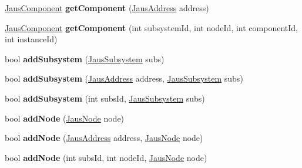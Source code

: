 \begin{DoxyCompactItemize}
\item 
\hypertarget{class_system_tree_addcab0b281dd5ad17c04c2c3c777c6d6}{\hyperlink{struct_jaus_component_struct}{\-Jaus\-Component} {\bfseries get\-Component} (\hyperlink{struct_jaus_address_struct}{\-Jaus\-Address} address)}\label{class_system_tree_addcab0b281dd5ad17c04c2c3c777c6d6}

\item 
\hypertarget{class_system_tree_a0dce53c86d89f770d19dd4b92568b775}{\hyperlink{struct_jaus_component_struct}{\-Jaus\-Component} {\bfseries get\-Component} (int subsystem\-Id, int node\-Id, int component\-Id, int instance\-Id)}\label{class_system_tree_a0dce53c86d89f770d19dd4b92568b775}

\item 
\hypertarget{class_system_tree_a69a0cda5b5d8525c29770ed3c6b3adee}{bool {\bfseries add\-Subsystem} (\hyperlink{struct_jaus_subsystem_struct}{\-Jaus\-Subsystem} subs)}\label{class_system_tree_a69a0cda5b5d8525c29770ed3c6b3adee}

\item 
\hypertarget{class_system_tree_a1afab58455805a6cc06974d6474d6903}{bool {\bfseries add\-Subsystem} (\hyperlink{struct_jaus_address_struct}{\-Jaus\-Address} address, \hyperlink{struct_jaus_subsystem_struct}{\-Jaus\-Subsystem} subs)}\label{class_system_tree_a1afab58455805a6cc06974d6474d6903}

\item 
\hypertarget{class_system_tree_a507ba858514647fd4d1378e26daa619e}{bool {\bfseries add\-Subsystem} (int subs\-Id, \hyperlink{struct_jaus_subsystem_struct}{\-Jaus\-Subsystem} subs)}\label{class_system_tree_a507ba858514647fd4d1378e26daa619e}

\item 
\hypertarget{class_system_tree_a0219abc8ed242e8ec6d894ad53c5a751}{bool {\bfseries add\-Node} (\hyperlink{struct_jaus_node_struct}{\-Jaus\-Node} node)}\label{class_system_tree_a0219abc8ed242e8ec6d894ad53c5a751}

\item 
\hypertarget{class_system_tree_a9de3187464ec23297bbbff3896f4e430}{bool {\bfseries add\-Node} (\hyperlink{struct_jaus_address_struct}{\-Jaus\-Address} address, \hyperlink{struct_jaus_node_struct}{\-Jaus\-Node} node)}\label{class_system_tree_a9de3187464ec23297bbbff3896f4e430}

\item 
\hypertarget{class_system_tree_a624c194e48883481614208b0027f1f48}{bool {\bfseries add\-Node} (int subs\-Id, int node\-Id, \hyperlink{struct_jaus_node_struct}{\-Jaus\-Node} node)}\label{class_system_tree_a624c194e48883481614208b0027f1f48}


\end{DoxyCompactItemize}
